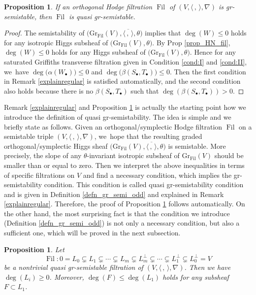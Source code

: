 \documentclass[11pt]{article}
\numberwithin{equation}{section}
\newcommand{\sbullet}{{\scriptscriptstyle\bullet}}
\newcommand{\grsemistable}{gr\nobreakdash-semi\-stable\xspace}
\DeclareMathOperator{\Filt}{Fil}
\newcommand{\Gr}{\mathrm{Gr}}
\theoremstyle{plain}
\newtheorem{prop}[thm]{Proposition}
\theoremstyle{definition}
\begin{document}
\begin{prop}\label{ssregular}
If an orthogonal Hodge filtration $\Filt$ of $(V,\langle \,, \, \rangle,\nabla)$ is \grsemistable, then $\Filt$ is quasi \grsemistable.
\end{prop}

\begin{proof}
The semistability of $\big(\Gr_{\Filt}(V), \overline{\langle \,, \, \rangle}, \theta\big)$ implies that $\deg(W)\leq 0$ holds for any isotropic Higgs subsheaf of $\big(\Gr_{\Filt}(V),\theta\big)$. By Prop \ref{prop_HN_fil}, $\deg(W)\leq 0$ holds for any Higgs subsheaf of $\big(\Gr_{\Filt}(V),\theta\big)$. Hence for any saturated Griffiths transverse filtration given in Condition \eqref{cond:I} and \eqref{cond:II}, we~have $\deg\big(\alpha(W_\sbullet)\big)\leq 0$ and $\deg\big(\beta(S_\sbullet,T_\sbullet)\big)\leq0$. Then the first condition in Remark \ref{explainregular} is satisfied automatically, and the second condition also holds because there is no $\beta(S_\sbullet,T_\sbullet)$ such that $\deg( \beta(S_\sbullet,T_\sbullet)) > 0$.
\end{proof}

Remark \ref{explainregular} and Proposition \ref{ssregular} is actually the starting point how we introduce the definition of quasi gr-semistability. The idea is simple and we briefly state as follows. Given an orthogonal/symplectic Hodge filtration $\Filt$ on a semistable triple $(V, \langle \,,\, \rangle, \nabla)$, we~hope that the resulting graded orthogonal/symplectic Higgs sheaf $\big(\Gr_{\Filt}(V), \overline{\langle \,, \, \rangle}, \theta\big)$ is semistable. More precisely, the slope of any $\theta$-invariant isotropic subsheaf of $\Gr_{\Filt}(V)$ should be smaller than or equal to zero. Then we interpret the above inequalities in terms of specific filtrations on $V$ and find a necessary condition, which implies the gr-semistability condition. This condition is called quasi gr-semistability condition and is given in Definition \ref{defn_gr_semi_odd} and explained in Remark \ref{explainregular}. Therefore, the proof of Proposition \ref{ssregular} follows automatically. On the other hand, the most surprising fact is that the condition we introduce (Definition \ref{defn_gr_semi_odd}) is not only a necessary condition, but also a sufficient one, which will be proved in the next subsection.

\begin{prop}\label{positive}
Let
\[
\Filt: 0= L_0 \subsetneq L_1 \subsetneq \cdots \subsetneq L_m \subsetneq L_m^\perp\subsetneq\cdots \subsetneq L_1^\perp\subsetneq L_0^\perp= V
\]
be a nontrivial quasi \grsemistable filtration of $(V, \langle \,, \, \rangle, \nabla)$. Then we have $\deg(L_i)\geq 0$. Moreover, $\deg(F)\leq \deg(L_1)$ holds for any subsheaf $F\subset L_1$.
\end{prop}
\end{document}
